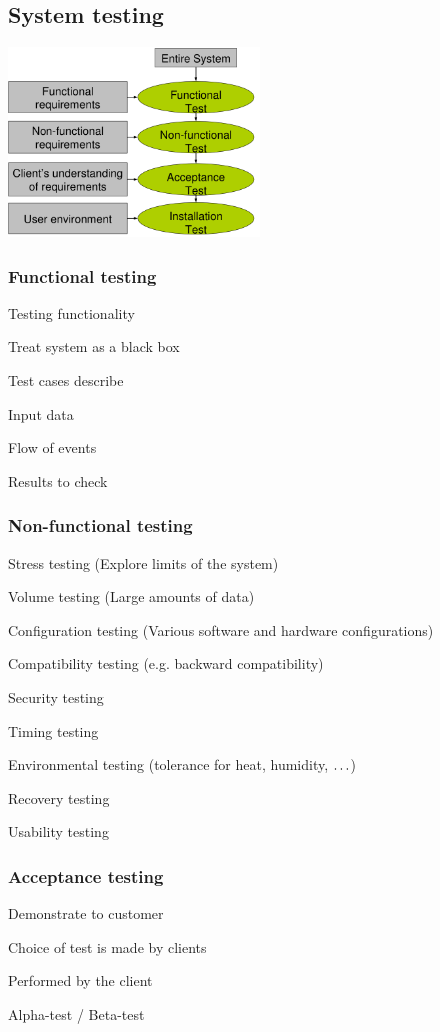 \documentclass[10pt]{article}
\begin{document}
\subsection{System testing}
\includegraphics[width=0.5\textwidth]{system_testing.png}

\subsubsection{Functional testing}
\enumstart
	\item Testing functionality
	\item Treat system as a black box
	\item Test cases describe
	\enumstart
		\item Input data
		\item Flow of events
		\item Results to check
	\enumend
\enumend

\subsubsection{Non-functional testing}
\enumstart
	\item Stress testing (Explore limits of the system)
	\item Volume testing (Large amounts of data)
	\item Configuration testing (Various software and hardware configurations)
	\item Compatibility testing (e.g. backward compatibility)
	\item Security testing
	\item Timing testing
	\item Environmental testing (tolerance for heat, humidity, $\mathellipsis$)
	\item Recovery testing
	\item Usability testing
\enumend

\subsubsection{Acceptance testing}
\enumstart
	\item Demonstrate to customer
	\item Choice of test is made by clients
	\item Performed by the client
	\item Alpha-test / Beta-test
\enumend
\end{document}

